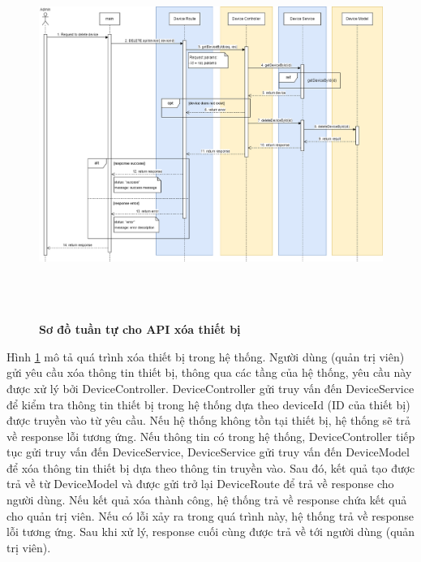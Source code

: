  \begin{figure}[H]
  \centering
  \includegraphics[width=16cm,height=12cm]{Images/sequence_api/deleteDeviceById.png}
  \caption[Sơ đồ tuần tự cho API xóa thiết bị]{\bfseries \fontsize{12pt}{0pt}
  \selectfont Sơ đồ tuần tự cho API xóa thiết bị }
  \label{api_deleteDeviceById} %
\end{figure}
Hình \ref{api_deleteDeviceById} mô tả quá trình xóa thiết bị trong hệ thống. Người dùng (quản trị viên) gửi yêu cầu xóa thông tin thiết bị, thông qua các tầng của hệ thống, 
yêu cầu này được xử lý bởi DeviceController. DeviceController gửi truy vấn đến DeviceService để kiểm tra thông tin thiết bị trong hệ thống dựa theo deviceId (ID của thiết bị) được truyền vào từ yêu cầu. 
Nếu hệ thống không tồn tại thiết bị, hệ thống sẽ trả về response lỗi tương ứng. Nếu thông tin có trong hệ thống, DeviceController tiếp tục gửi truy vấn đến DeviceService, DeviceService gửi truy vấn đến DeviceModel để xóa thông tin thiết bị 
dựa theo thông tin truyền vào. Sau đó, kết quả tạo được trả về từ DeviceModel và được gửi trở lại DeviceRoute để trả về response cho người dùng. Nếu kết quả xóa thành công, hệ thống trả về response chứa kết quả cho quản trị viên. 
Nếu có lỗi xảy ra trong quá trình này, hệ thống trả về response lỗi tương ứng. Sau khi xử lý, response cuối cùng được trả về tới người dùng (quản trị viên).


